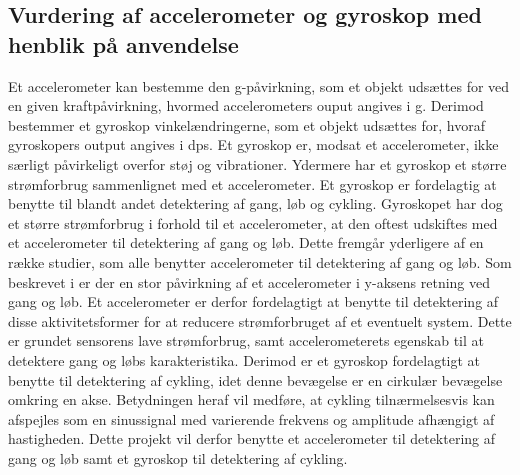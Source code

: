 \subsection{Vurdering af accelerometer og gyroskop med henblik på anvendelse}\label{acc_og_gyro}
Et accelerometer kan bestemme den g-påvirkning, som et objekt udsættes for ved en given kraftpåvirkning, hvormed accelerometers ouput angives i g. Derimod bestemmer et gyroskop vinkelændringerne, som et objekt udsættes for, hvoraf gyroskopers output angives i dps. Et gyroskop er, modsat et accelerometer, ikke særligt påvirkeligt overfor støj og vibrationer. \citep{Goodrich2013,TittertonWeston2004,LuingeVeltink2005} Ydermere har et gyroskop et større strømforbrug sammenlignet med et accelerometer. Et gyroskop er fordelagtig at benytte til blandt andet detektering af gang, løb og cykling. Gyroskopet har dog et større strømforbrug i forhold til et accelerometer, at den oftest udskiftes med et accelerometer til detektering af gang og løb. Dette fremgår yderligere af en række studier, som alle benytter accelerometer til detektering af gang og løb. \citep{Sparkfun,Rueterbories2010,ClelandKikhia2013} \newline
Som beskrevet i  er der en stor påvirkning af et accelerometer i y-aksens retning ved gang og løb. Et accelerometer er derfor fordelagtigt at benytte til detektering af disse aktivitetsformer for at reducere strømforbruget af et eventuelt system. Dette er grundet sensorens lave strømforbrug, samt accelerometerets egenskab til at detektere gang og løbs karakteristika. Derimod er et gyroskop fordelagtigt at benytte til detektering af cykling, idet denne bevægelse er en cirkulær bevægelse omkring en akse. Betydningen heraf vil medføre, at cykling tilnærmelsesvis kan afspejles som en sinussignal med varierende frekvens og amplitude afhængigt af hastigheden. \citep{TittertonWeston2004,LuingeVeltink2005} \newline
Dette projekt vil derfor benytte et accelerometer til detektering af gang og løb samt et gyroskop til detektering af cykling.